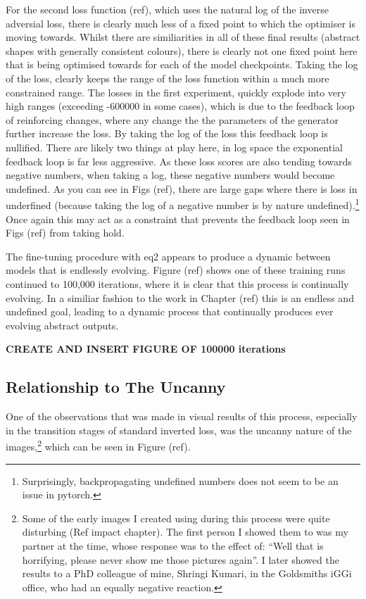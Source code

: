 For the second loss function (ref), which uses the natural log of the inverse adversial loss, there is clearly much less of a fixed point to which the optimiser is moving towards. 
Whilst there are similiarities in all of these final results (abstract shapes with generally consistent colours), there is clearly not one fixed point here that is being optimised towards for each of the model checkpoints.
Taking the log of the loss, clearly keeps the range of the loss function within a much more constrained range.
The losses in the first experiment, quickly explode into very high ranges (exceeding -600000 in some cases), which is due to the feedback loop of reinforcing changes, where any change the the parameters of the generator further increase the loss.
By taking the log of the loss this feedback loop is nullified. 
There are likely two things at play here, in log space the exponential feedback loop is far less aggressive. 
As these loss scores are also tending towards negative numbers, when taking a log, these negative numbers would become undefined.
As you can see in Figs (ref), there are large gaps where there is loss in underfined (because taking the log of a negative number is by nature undefined).\footnote{Surprisingly, backpropagating undefined numbers does not seem to be an issue in pytorch.}
Once again this may act as a constraint that prevents the feedback loop seen in Figs (ref) from taking hold.

The fine-tuning procedure with eq2 appears to produce a dynamic between models that is endlessly evolving. 
Figure (ref) shows one of these training runs continued to 100,000 iterations, where it is clear that this process is continually evolving.
In a similiar fashion to the work in Chapter (ref) this is an endless and undefined goal, leading to a dynamic process that continually produces ever evolving abstract outputs.

\textbf{CREATE AND INSERT FIGURE OF 100000 iterations}

\subsection{Relationship to The Uncanny}

One of the observations that was made in visual results of this process, especially in the transition stages of standard inverted loss, was the uncanny nature of the images,\footnote{
      Some of the early images I created using during this process were quite disturbing  (Ref impact chapter). The first person I showed them to was my partner at the time, whose response was to the effect of: ``Well that is horrifying, please never show me those pictures again''. I later showed the results to a PhD colleague of mine, Shringi Kumari, in the Goldsmiths iGGi office, who had an equally negative reaction.} which can be seen in Figure (ref).

